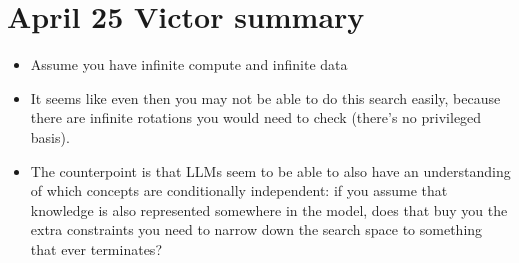 \documentclass{article}
\begin{document}
\section{April 25 Victor summary}
\begin{itemize}
    \item Assume you have infinite compute and infinite data
    \item It seems like even then you may not be able to do this search easily, because there are infinite rotations you would need to check (there's no privileged basis).
    \item The counterpoint is that LLMs seem to be able to also have an understanding of which concepts are conditionally independent: if you assume that knowledge is also represented somewhere in the model, does that buy you the extra constraints you need to narrow down the search space to something that ever terminates?
\end{itemize}
\end{document}

